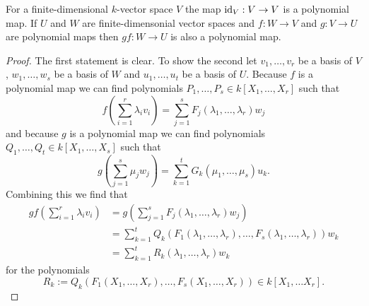 \begin{lem}
 For a finite-dimensional $k$-vector space $V$ the map $\operatorname{id}_V : V \to V$ is a polynomial map. If $U$ and $W$ are finite-dimensonial vector spaces and $f : W \to V$ and $g : V \to U$ are polynomial maps then $gf : W \to U$ is also a polynomial map.
\end{lem}
\begin{proof}
 The first statement is clear. To show the second let $v_1, \ldots, v_r$ be a basis of $V$, $w_1, \ldots, w_s$ be a basis of $W$ and $u_1, \ldots, u_t$ be a basis of $U$. Because $f$ is a polynomial map we can find polynomials $P_1, \ldots, P_s \in k[X_1, \ldots, X_r]$ such that
 \[
  f\left(\sum_{i=1}^r \lambda_i v_i\right) = \sum_{j=1}^s F_j(\lambda_1, \ldots, \lambda_r) w_j
 \]
 and because $g$ is a polynomial map we can find polynomials $Q_1, \ldots, Q_t \in k[X_1, \ldots, X_s]$ such that
 \[
  g\left(\sum_{j=1}^s \mu_j w_j\right) = \sum_{k=1}^t G_k(\mu_1, \ldots, \mu_s) u_k.
 \]
 Combining this we find that
 \begin{align*}
  gf\left(\sum_{i=1}^r \lambda_i v_i\right)
  &= g\left(\sum_{j=1}^s F_j(\lambda_1, \ldots, \lambda_r) w_j\right) \\
  &= \sum_{k=1}^t Q_k(F_1(\lambda_1, \ldots, \lambda_r), \ldots, F_s(\lambda_1, \ldots, \lambda_r)) w_k \\
  &= \sum_{k=1}^t R_k(\lambda_1, \ldots, \lambda_r) w_k
 \end{align*}
 for the polynomials
 \[
  R_k := Q_k(F_1(X_1, \ldots, X_r), \ldots, F_s(X_1, \ldots, X_r)) \in k[X_1, \ldots X_r].
 \]
\end{proof}


